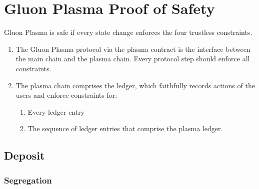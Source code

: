 \documentclass[10pt]{article}
\begin{document}
\section{Gluon Plasma Proof of Safety}

Gluon Plasma is safe if every state change enforces the four trustless constraints.

\begin{enumerate}
    \item The Gluon Plasma protocol via the plasma contract is the interface between the main chain and the plasma chain. Every protocol step should enforce all constraints.
    \item The plasma chain comprises the ledger, which faithfully records actions of the users and enforce constraints for: 
    \begin{enumerate}
        \item Every ledger entry
        \item The sequence of ledger entries that comprise the plasma ledger.
    \end{enumerate}
\end{enumerate}
\subsection{Deposit}
\subsubsection{Segregation}
\end{document}
